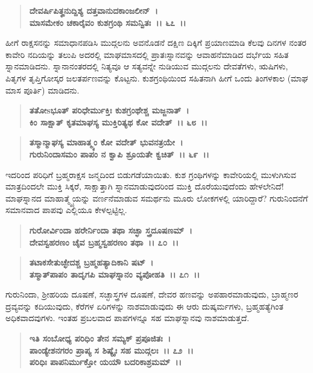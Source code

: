 \begin{verse}
\textbf{ದೇವರ್ಷಿಪಿತೄನುದ್ದಿಶ್ಯ ದತ್ತವಾನುದಕಾಂಜಲೀನ್~।}\\\textbf{ಮಾಸಮೇಕಂ ಚಕಾರೈವಂ ಕುಶಗ್ರಂಥಿ ಸಮನ್ವಿತಃ~।। ೬೭~।।}
\end{verse}

ಹೀಗೆ ರಾಕ್ಷಸನನ್ನು ಸಮಾಧಾನಪಡಿಸಿ ಮುದ್ಗಲನು ಅವನೊಡನೆ ದಕ್ಷಿಣ ದಿಕ್ಕಿಗೆ ಪ್ರಯಾಣಮಾಡಿ ಕೆಲವು ದಿನಗಳ ನಂತರ ಕಾವೇರಿ ನದಿಯನ್ನು ತಲುಪಿ ಅದರಲ್ಲಿ ಮಾಘಮಾಸದಲ್ಲಿ ಪ್ರಾತಃಸ್ನಾನವನ್ನು ಆವಾಹನೆಮಾಡಿದ ದರ್ಭೆಯ ಸಹಿತ ಸ್ನಾನಮಾಡಿದನು. ಸ್ನಾನಾನಂತರದಲ್ಲಿ ನಿತ್ಯವೂ ಆ ಸತ್ಯವನ್ನೇ ನುಡಿಯುವ ಮುದ್ಗಲನು ದೇವತೆಗಳು, ಋಷಿಗಳು, ಪಿತೃಗಳ ತೃಪ್ತಿಗೋಸ್ಕರ ಜಲತರ್ಪಣವನ್ನು ಕೊಟ್ಟನು. ಕುಶಗ್ರಂಥಿಯಿಂದ ಸಹಿತನಾಗಿ ಹೀಗೆ ಒಂದು ತಿಂಗಳಕಾಲ (ಮಾಘ ಮಾಸ ಪೂರ್ತಿ) ಮಾಡಿದನು.

\begin{verse}
\textbf{ತತೋsಭೂತ್ ಪರಿಧೇರ್ಮುಕ್ತಿಃ ಕುಶಗ್ರಂಥೇಶ್ಚ ಮಜ್ಜನಾತ್~।}\\\textbf{ಕಿಂ ಸಾಕ್ಷಾತ್ ಕೃತಮಾಘಸ್ಯ ಮುಕ್ತಿರಿತ್ಯಥ ಕೋ ವದೇತ್~।। ೬೮~।।} 
\end{verse}

\begin{verse}
\textbf{ತಸ್ಮಾನ್ಮಾಘಸ್ಯ ಮಾಹಾತ್ಮ್ಯಂ ಕೋ ವದೇತ್ ಭುವನತ್ರಯೇ~।}\\\textbf{ಗುರುನಿಂದಾಸಮಂ ಪಾಪಂ ನ ಕ್ವಾಪಿ ಶ್ರೂಯತೇ ಕ್ವಚಿತ್~।। ೬೯~।।}
\end{verse}

ಇದರಿಂದ ಪರಿಧಿಗೆ ಬ್ರಹ್ಮರಾಕ್ಷಸ ಜನ್ಮದಿಂದ ಬಿಡುಗಡೆಯಾಯಿತು. ಕುಶ ಗ್ರಂಥಿಗಳನ್ನು ಕಾವೇರಿಯಲ್ಲಿ ಮುಳುಗಿಸುವ ಮಾತ್ರದಿಂದಲೇ ಮುಕ್ತಿ ಸಿಕ್ಕರೆ, ಸಾಕ್ಷಾತ್ತಾಗಿ ಸ್ನಾನಮಾಡುವುದರಿಂದ ಮುಕ್ತಿ ದೊರೆಯುವುದೆಂದು ಹೇಳಲೇನಿದೆ! ಮಾಘಸ್ನಾನದ ಮಾಹಾತ್ಮ್ಯೈಯನ್ನು ವರ್ಣನೆ\-ಮಾಡುವ ಸಮರ್ಥನು ಮೂರು ಲೋಕಗಳಲ್ಲಿ ಯಾರಿದ್ದಾರೆ? ಗುರುನಿಂದನೆಗೆ ಸಮಾನವಾದ ಪಾಪವು ಎಲ್ಲಿಯೂ ಕೇಳಲ್ಪಟ್ಟಿಲ್ಲ.

\begin{verse}
\textbf{ಗುರೋರ್ವಿಂದಾ ಹರೇರ್ನಿಂದಾ ತಥಾ ಸಚ್ಛಾ ಸ್ತ್ರದೂಷಣಮ್~।}\\\textbf{ದೇವಸ್ವಹರಣಂ ಚೈವ ಬ್ರಹ್ಮಸ್ವಹರಣಂ ತಥಾ~।। ೭೦~।।} 
\end{verse}

\begin{verse}
\textbf{ತಟಾಕಸೇತುಚ್ಛೇದಶ್ಚ ಬ್ರಹ್ಮಹತ್ಯಾದಿಕಾನಿ ಷಟ್~।}\\\textbf{ತಸ್ಮಾತ್‌ಪಾಪಂ ತಾದೃಗಪಿ ಮಾಘಸ್ನಾನಂ ವ್ಯಪೋಹತಿ~।। ೭೧~।।}
\end{verse}

ಗುರುನಿಂದಾ, ಶ‍್ರೀಹರಿಯ ದೂಷಣೆ, ಸಚ್ಛಾಸ್ತ್ರಗಳ ದೂಷಣೆ, ದೇವರ ಹಣವನ್ನು ಅಪಹಾರಮಾಡುವುದು, ಬ್ರಾಹ್ಮಣರ ದ್ರವ್ಯವನ್ನು ಕದಿಯುವುದು, ಕೆರೆಗಳ ಏರಿಗಳನ್ನು ನಾಶಮಾಡುವುದು ಈ ಆರು ದುಷ್ಕರ್ಮಗಳು, ಬ್ರಹ್ಮಹತ್ಯೆಗಿಂತ ಅಧಿಕವಾದವುಗಳು. ಇಂತಹ ಪ್ರಬಲವಾದ ಪಾಪಗಳನ್ನೂ ಸಹ ಮಾಘಸ್ನಾನವು ನಾಶಮಾಡುತ್ತದೆ.

\begin{verse}
\textbf{ಇತಿ ಸಂಬೋಧ್ಯ ಪರಿಧಿಂ ತೇನ ಸಮ್ಯಕ್ ಪ್ರಪೂಜಿತಃ~।}\\\textbf{ಪಾಂಡ್ಯೇಶನಗರಂ ಪ್ರಾಪ್ಯ ಸ ಶಿಷ್ಯೈಃ ಸಹ ಮುದ್ಗಲಃ~।। ೭೨~।।}\\\textbf{ಪರಿಧಿಃ ಪಾಪನಿರ್ಮುಕ್ತೋ ಯಯೌ ಬದರಿಕಾಶ್ರಮಮ್~।।}
\end{verse}

